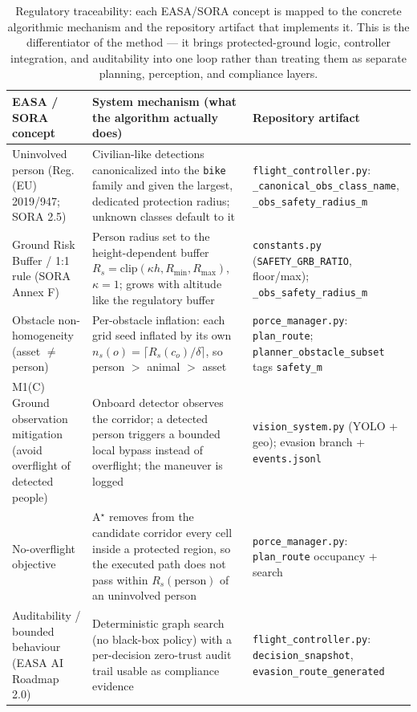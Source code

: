 \begin{table}[t]
    \centering
    \small
    \begin{tabular}{@{}p{} p{} p{}@{}}
        \toprule
        \textbf{EASA / SORA concept} & \textbf{System mechanism (what the algorithm actually does)} & \textbf{Repository artifact} \\
        \midrule
        Uninvolved person (Reg. (EU) 2019/947; SORA 2.5) &
        Civilian-like detections canonicalized into the \texttt{bike} family and given the largest, dedicated protection radius; unknown classes default to it &
        \texttt{flight\_controller.py}: \texttt{\_canonical\_obs\_class\_name}, \texttt{\_obs\_safety\_radius\_m} \\

        Ground Risk Buffer / 1:1 rule (SORA Annex F) &
        Person radius set to the height-dependent buffer $R_s=\mathrm{clip}(\kappa h,R_{\min},R_{\max})$, $\kappa=1$; grows with altitude like the regulatory buffer &
        \texttt{constants.py} (\texttt{SAFETY\_GRB\_RATIO}, floor/max); \texttt{\_obs\_safety\_radius\_m} \\

        Obstacle non-homogeneity (asset $\neq$ person) &
        Per-obstacle inflation: each grid seed inflated by its own $n_s(o)=\lceil R_s(c_o)/\delta\rceil$, so person $>$ animal $>$ asset &
        \texttt{porce\_manager.py}: \texttt{plan\_route}; \texttt{planner\_obstacle\_subset} tags \texttt{safety\_m} \\

        M1(C) Ground observation mitigation (avoid overflight of detected people) &
        Onboard detector observes the corridor; a detected person triggers a bounded local bypass instead of overflight; the maneuver is logged &
        \texttt{vision\_system.py} (YOLO + geo); evasion branch + \texttt{events.jsonl} \\

        No-overflight objective &
        A$^\star$ removes from the candidate corridor every cell inside a protected region, so the executed path does not pass within $R_s(\text{person})$ of an uninvolved person &
        \texttt{porce\_manager.py}: \texttt{plan\_route} occupancy + search \\

        Auditability / bounded behaviour (EASA AI Roadmap 2.0) &
        Deterministic graph search (no black-box policy) with a per-decision zero-trust audit trail usable as compliance evidence &
        \texttt{flight\_controller.py}: \texttt{decision\_snapshot}, \texttt{evasion\_route\_generated} \\
        \bottomrule
    \end{tabular}
    \caption{Regulatory traceability: each EASA/SORA concept is mapped to the concrete algorithmic mechanism and the repository artifact that implements it. This is the differentiator of the method --- it brings protected-ground logic, controller integration, and auditability into one loop rather than treating them as separate planning, perception, and compliance layers.}
    \label{tab:traceability}
\end{table}

